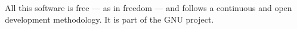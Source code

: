All this software is free --- as in freedom --- and follows a
continuous and open development methodology. It is part of the GNU
project.














